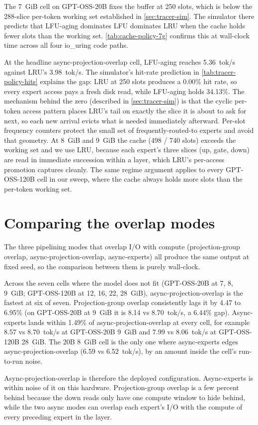 The 7~GiB cell on GPT-OSS-20B fixes the buffer at 250 slots, which is below the 288-slice per-token working set established in \autoref{sec:tracer-sim}.
The simulator there predicts that LFU-aging dominates LFU dominates LRU when the cache holds fewer slots than the working set.
\autoref{tab:cache-policy-7g} confirms this at wall-clock time across all four io\_uring code paths.

At the headline async-projection-overlap cell, LFU-aging reaches 5.36~tok/s against LRU's 3.98~tok/s. The simulator's hit-rate prediction in \autoref{tab:tracer-policy-hits} explains the gap: LRU at 250 slots produces a 0.00\% hit rate, so every expert access pays a fresh disk read, while LFU-aging holds 34.13\%. The mechanism behind the zero (described in \autoref{sec:tracer-sim}) is that the cyclic per-token access pattern places LRU's tail on exactly the slice it is about to ask for next, so each new arrival evicts what is needed immediately afterward. Per-slot frequency counters protect the small set of frequently-routed-to experts and avoid that geometry.
At 8~GiB and 9~GiB the cache (498 / 740 slots) exceeds the working set and we use LRU, because each expert's three slices (up, gate, down) are read in immediate succession within a layer, which LRU's per-access promotion captures cleanly.
The same regime argument applies to every GPT-OSS-120B cell in our sweep, where the cache always holds more slots than the per-token working set.


\section{Comparing the overlap modes}\label{sec:eval-overlap}

The three pipelining modes that overlap I/O with compute (projection-group overlap, async-projection-overlap, async-experts) all produce the same output at fixed seed, so the comparison between them is purely wall-clock.

Across the seven cells where the model does not fit (GPT-OSS-20B at 7, 8, 9~GiB; GPT-OSS-120B at 12, 16, 22, 28~GiB), async-projection-overlap is the fastest at six of seven.
Projection-group overlap consistently lags it by 4.47 to 6.95\% (on GPT-OSS-20B at 9~GiB it is 8.14 vs 8.70~tok/s, a 6.44\% gap).
Async-experts lands within 1.49\% of async-projection-overlap at every cell, for example 8.57 vs 8.70~tok/s at GPT-OSS-20B 9~GiB and 7.99 vs 8.06~tok/s at GPT-OSS-120B 28~GiB.
The 20B 8~GiB cell is the only one where async-experts edges async-projection-overlap (6.59 vs 6.52~tok/s), by an amount inside the cell's run-to-run noise.

Async-projection-overlap is therefore the deployed configuration.
Async-experts is within noise of it on this hardware.
Projection-group overlap is a few percent behind because the down reads only have one compute window to hide behind, while the two async modes can overlap each expert's I/O with the compute of every preceding expert in the layer.
